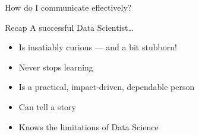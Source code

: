 \begin{frame}{How do I communicate effectively?}
\end{frame}

\begin{frame}{Recap}
    A successful Data Scientist\ldots
    \begin{itemize}
        \item Is insatiably curious --- and a bit stubborn!
        \item Never stops learning
        \item Is a practical, impact\hyp{}driven, dependable person
        \item Can tell a story
        \item Knows the limitations of Data Science
    \end{itemize}
\end{frame}




